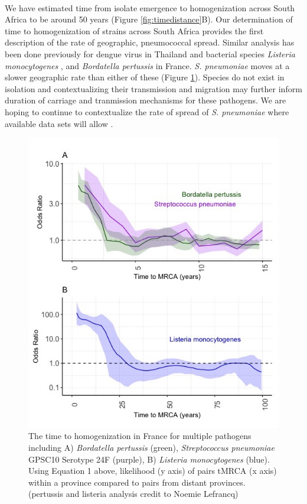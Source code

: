 \documentclass{article}
\begin{document}
 \\We have estimated time from isolate emergence to homogenization across South Africa to be around 50 years (Figure \ref{fig:timedistance}B). Our determination of time to homogenization of strains across South Africa provides the first description of the rate of geographic, pneumococcal spread. Similar analysis has been done previously for dengue virus in Thailand \cite{saljeDengueDiversitySpatial2017} and bacterial species \textit{Listeria monocytogenes} \cite{mouraEmergenceGlobalSpread2020}, and \textit{Bordatella pertussis} in France. \textit{S. pneumoniae} moves at a slower geographic rate than either of these (Figure \ref{fig:contextpaths}). Species do not exist in isolation and contextualizing their transmission and migration may further inform duration of carriage and tranmission mechanisms for these pathogens. We are hoping to continue to contextualize the rate of spread of \textit{S. pneumoniae} where available data sets will allow \cite{metcalfComparingAgeSex2021}. 
 \begin{figure}[H]
 \centering
    \includegraphics[width=\textwidth]{context_pathogens.jpeg}
    \caption{The time to homogenization in France for multiple pathogens including A) \textit{Bordatella pertussis} (green), \textit{Streptococcus pneumoniae} GPSC10 Serotype 24F (purple), B) \textit{Listeria monocytogenes} (blue). Using Equation 1 above, likelihood (y axis) of pairs tMRCA (x axis) within a province compared to pairs from distant provinces. (pertussis and listeria analysis credit to Noemie Lefrancq) }
      \label{fig:contextpaths}
 \end{figure}
\end{document}
